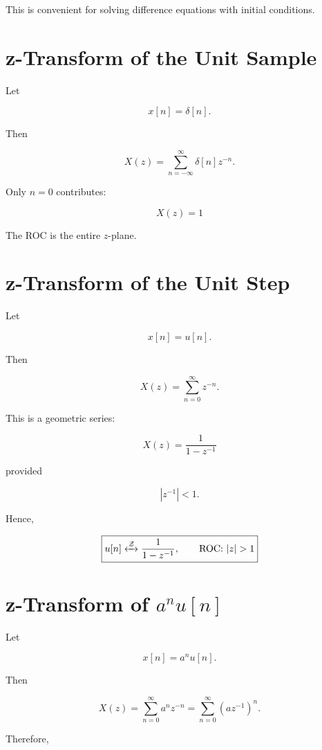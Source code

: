This is convenient for solving difference equations with initial conditions.


\section{z-Transform of the Unit Sample}

Let

\[
x[n]=\delta[n].
\]

Then

\[
X(z)=
\sum_{n=-\infty}^{\infty}
\delta[n]z^{-n}.
\]

Only \(n=0\) contributes:

\[
\boxed{
X(z)=1
}
\]

The ROC is the entire \(z\)-plane.


\section{z-Transform of the Unit Step}

Let

\[
x[n]=u[n].
\]

Then

\[
X(z)=
\sum_{n=0}^{\infty}z^{-n}.
\]

This is a geometric series:

\[
X(z)=
\frac{1}{1-z^{-1}}
\]

provided

\[
|z^{-1}|<1.
\]

Hence,

\[
\boxed{
u[n]
\xleftrightarrow{\mathcal{Z}}
\frac{1}{1-z^{-1}},
\qquad
\text{ROC: }|z|>1
}
\]


\section{z-Transform of \(a^n u[n]\)}

Let

\[
x[n]=a^n u[n].
\]

Then

\[
X(z)=
\sum_{n=0}^{\infty}
a^n z^{-n}
=
\sum_{n=0}^{\infty}
(az^{-1})^n.
\]

Therefore,

